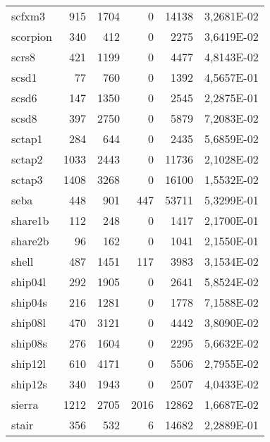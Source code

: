 {\begin{longtable}{>{\ttfamily}lrrrrc}
scfxm3       & 915       & 1704      & 0           & 14138    & \num{3,2681E-02} \\
scorpion     & 340       & 412       & 0           & 2275     & \num{3,6419E-02} \\
scrs8        & 421       & 1199      & 0           & 4477     & \num{4,8143E-02} \\
scsd1        & 77        & 760       & 0           & 1392     & \num{4,5657E-01} \\
scsd6        & 147       & 1350      & 0           & 2545     & \num{2,2875E-01} \\
scsd8        & 397       & 2750      & 0           & 5879     & \num{7,2083E-02} \\
sctap1       & 284       & 644       & 0           & 2435     & \num{5,6859E-02} \\
sctap2       & 1033      & 2443      & 0           & 11736    & \num{2,1028E-02} \\
sctap3       & 1408      & 3268      & 0           & 16100    & \num{1,5532E-02} \\
seba         & 448       & 901       & 447         & 53711    & \num{5,3299E-01} \\
share1b      & 112       & 248       & 0           & 1417     & \num{2,1700E-01} \\
share2b      & 96        & 162       & 0           & 1041     & \num{2,1550E-01} \\
shell        & 487       & 1451      & 117         & 3983     & \num{3,1534E-02} \\
ship04l      & 292       & 1905      & 0           & 2641     & \num{5,8524E-02} \\
ship04s      & 216       & 1281      & 0           & 1778     & \num{7,1588E-02} \\
ship08l      & 470       & 3121      & 0           & 4442     & \num{3,8090E-02} \\
ship08s      & 276       & 1604      & 0           & 2295     & \num{5,6632E-02} \\
ship12l      & 610       & 4171      & 0           & 5506     & \num{2,7955E-02} \\
ship12s      & 340       & 1943      & 0           & 2507     & \num{4,0433E-02} \\
sierra       & 1212      & 2705      & 2016        & 12862    & \num{1,6687E-02} \\
stair        & 356       & 532       & 6           & 14682    & \num{2,2889E-01} \\

\end{longtable}}
